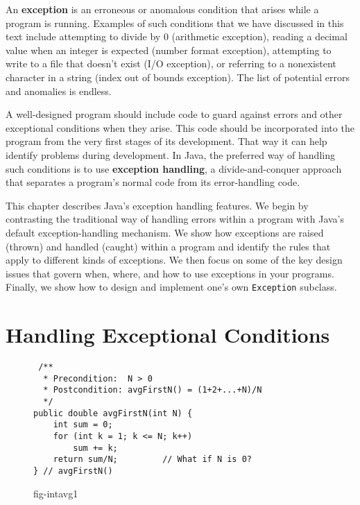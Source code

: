 An {\bf exception} is an erroneous or anomalous
condition that arises  while a program is
running. Examples of such conditions that we have discussed in this
text include attempting to divide by 0 (arithmetic exception), reading
a decimal value when an integer is expected (number format exception),
attempting to write to a file that doesn't exist (I/O exception), or
referring to a nonexistent character in a string (index out of bounds
exception).  The list of potential errors and anomalies is endless.

A well-designed program should include code to guard against errors
and other exceptional conditions when they arise.  This code should be
incorporated into the program from the very first stages of its
development.  That way it can help identify problems during
development. In Java, the preferred way of handling such conditions is
to use {\bf exception handling}, a 
divide-and-conquer approach that separates a program's normal code 
from its error-handling code.


This chapter describes Java's exception handling features.  We begin
by contrasting the traditional way of handling errors within a program
with Java's default exception-handling mechanism.  We show how
exceptions are raised (thrown) and handled (caught) within a program
and identify the rules that apply to different kinds of exceptions.
We then focus on some of the key design issues that govern when,
where, and how to use exceptions in your programs.  Finally, we show
how to design and implement one's own {\tt Exception} subclass.

\section{Handling Exceptional Conditions}
\label{handling-exceptional-conditions}

\begin{figure}[b]
\jjjprogstart
\begin{jjjlisting}
\begin{lstlisting}
 /**
  * Precondition:  N > 0
  * Postcondition: avgFirstN() = (1+2+...+N)/N
  */
public double avgFirstN(int N) {
    int sum = 0;
    for (int k = 1; k <= N; k++)
        sum += k;
    return sum/N;         // What if N is 0?
} // avgFirstN()
\end{lstlisting}
\end{jjjlisting}
{fig-intavg1}
\end{figure}

